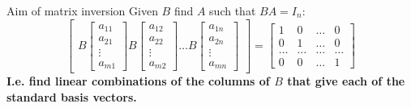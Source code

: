 \documentclass{beamer}
\begin{document}
\begin{frame}{Aim of matrix inversion}
  Given $B$ find $A$ such that $BA=I_n$:\vfill
  \begin{equation*}
    \left[
      \begin{array}{cccc}
        B \left[
	\begin{array}{c}
          a_{11}\\
          a_{21}\\
          \vdots\\
          a_{m1}
	\end{array}
        \right]
        B \left[
	\begin{array}{c}
          a_{12}\\
          a_{22}\\
          \vdots\\
          a_{m2}
	\end{array}
        \right]
        \dots
        B \left[
	\begin{array}{c}
          a_{1n}\\
          a_{2n}\\
          \vdots\\
          a_{mn}
	\end{array}
        \right]
      \end{array}
    \right]= \left[
      \begin{array}{cccc}
        1 & 0 & \dots & 0\\
        0 & 1 & \dots & 0\\
        \dots & \dots & \dots & \dots\\
        0 & 0 & \dots & 1
      \end{array}
    \right]
  \end{equation*}\vfill
  \bf{I.e. find linear combinations of the columns of $B$ that give each of the standard basis vectors.}
\end{frame}
\end{document}

